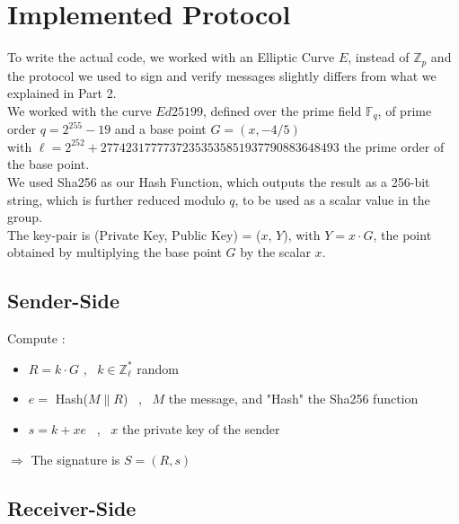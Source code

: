 \documentclass{article}
\begin{document}
\section{Implemented Protocol}

To write the actual code, we worked with an Elliptic Curve $E$, instead of $\mathbb{Z}_p$ and the protocol we used to sign and verify messages slightly differs from what we explained in Part 2. \\

\noindent
We worked with the curve $Ed25199$, defined over the prime field $\mathbb{F}_q$, of prime order $q = 2^{255} - 19$ and a base point $G = (x, -4/5)$ \\ with $\ell = 2^{252} + 27742317777372353535851937790883648493$ the prime order of the base point. \\

\noindent
We used Sha256 as our Hash Function, which outputs the result as a 256-bit string, which is further reduced modulo $q$, to be used as a scalar value in the group. \\

\noindent
The key-pair is (Private Key, Public Key) = ($x$, $Y$), with $Y = x \cdot G$, the point obtained by multiplying the base point $G$ by the scalar $x$.



\subsection{Sender-Side}

Compute : \

\begin{itemize}

    \item $R = k \cdot G$ \ , \ $k \in \mathbb{Z}_\ell^*$ random
    
    \item $e =$ Hash($M \| R$) \ , \ $M$ the message, and "Hash" the Sha256 function

    \item $s = k + xe$ \ , \ $x$ the private key of the sender

\end{itemize}

$\Rightarrow$ The signature is $S = (R, s)$



\subsection{Receiver-Side}
\end{document}
